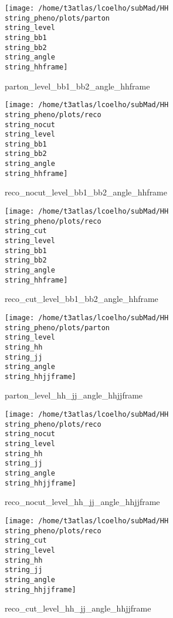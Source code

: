 \documentclass[a4paper,onecolumn,final,11pt]{article}
\begin{document}
\begin{figure}[H] 
\centering 
\begin{minipage}{.32\textwidth} 
        \centering 
        \hspace{0cm} 
        \texttt{[image: /home/t3atlas/lcoelho/subMad/HH\\string\_pheno/plots/parton\\string\_level\\string\_bb1\\string\_bb2\\string\_angle\\string\_hhframe]} 
        \caption{parton_level_bb1_bb2_angle_hhframe} 
\end{minipage} 
\hfill 
\begin{minipage}{.32\textwidth} 
        \centering 
        \hspace{0cm} 
    \texttt{[image: /home/t3atlas/lcoelho/subMad/HH\\string\_pheno/plots/reco\\string\_nocut\\string\_level\\string\_bb1\\string\_bb2\\string\_angle\\string\_hhframe]} 
        \caption{reco_nocut_level_bb1_bb2_angle_hhframe} 
\end{minipage} 
\hfill 
\begin{minipage}{.32\textwidth} 
        \centering 
        \hspace{0cm} 
    \texttt{[image: /home/t3atlas/lcoelho/subMad/HH\\string\_pheno/plots/reco\\string\_cut\\string\_level\\string\_bb1\\string\_bb2\\string\_angle\\string\_hhframe]} 
        \caption{reco_cut_level_bb1_bb2_angle_hhframe} 
\end{minipage} 
\end{figure} 
 
\begin{figure}[H] 
\centering 
\begin{minipage}{.32\textwidth} 
        \centering 
        \hspace{0cm} 
        \texttt{[image: /home/t3atlas/lcoelho/subMad/HH\\string\_pheno/plots/parton\\string\_level\\string\_hh\\string\_jj\\string\_angle\\string\_hhjjframe]} 
        \caption{parton_level_hh_jj_angle_hhjjframe} 
\end{minipage} 
\hfill 
\begin{minipage}{.32\textwidth} 
        \centering 
        \hspace{0cm} 
    \texttt{[image: /home/t3atlas/lcoelho/subMad/HH\\string\_pheno/plots/reco\\string\_nocut\\string\_level\\string\_hh\\string\_jj\\string\_angle\\string\_hhjjframe]} 
        \caption{reco_nocut_level_hh_jj_angle_hhjjframe} 
\end{minipage} 
\hfill 
\begin{minipage}{.32\textwidth} 
        \centering 
        \hspace{0cm} 
    \texttt{[image: /home/t3atlas/lcoelho/subMad/HH\\string\_pheno/plots/reco\\string\_cut\\string\_level\\string\_hh\\string\_jj\\string\_angle\\string\_hhjjframe]} 
        \caption{reco_cut_level_hh_jj_angle_hhjjframe} 
\end{minipage} 
\end{figure} 
 
\end{document}
